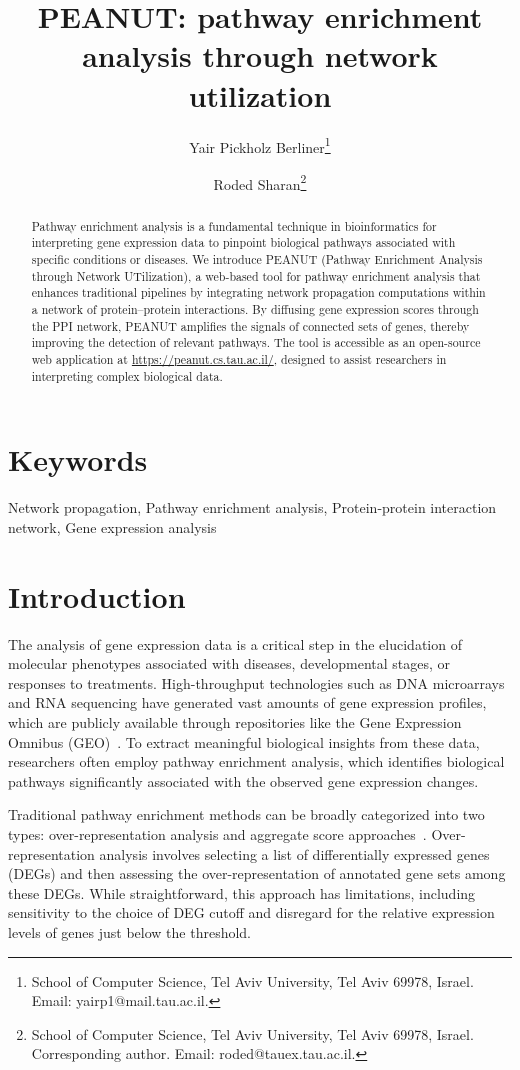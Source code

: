 \documentclass{article}
\title{PEANUT: pathway enrichment analysis through network utilization}
\author{
    Yair Pickholz Berliner\thanks{School of Computer Science, Tel Aviv University, Tel Aviv 69978, Israel. Email: yairp1@mail.tau.ac.il.} \and 
    Roded Sharan\thanks{School of Computer Science, Tel Aviv University, Tel Aviv 69978, Israel. Corresponding author. Email: roded@tauex.tau.ac.il.}
}
\date{}
\begin{document}
\maketitle
\begin{abstract}
Pathway enrichment analysis is a fundamental technique in bioinformatics for interpreting gene expression data to pinpoint biological pathways associated with specific conditions or diseases. We introduce PEANUT (Pathway Enrichment Analysis through Network UTilization), a web-based tool for pathway enrichment analysis that enhances traditional pipelines by integrating network propagation computations within a network of protein--protein interactions. By diffusing gene expression scores through the PPI network, PEANUT amplifies the signals of connected sets of genes, thereby improving the detection of relevant pathways.
The tool is accessible as an open-source web application at \url{https://peanut.cs.tau.ac.il/}, 
designed to assist researchers in interpreting complex biological data.
\end{abstract}

\section*{Keywords}
Network propagation, Pathway enrichment analysis, 
Protein-protein interaction network, Gene expression analysis

\section{Introduction}
The analysis of gene expression data is a critical step in the elucidation of molecular phenotypes associated with diseases, developmental stages, or responses to treatments. High-throughput technologies such as DNA microarrays and RNA sequencing have generated vast amounts of gene expression profiles, which are publicly available through repositories like the Gene Expression Omnibus (GEO)~\cite{Barrett2013}. To extract meaningful biological insights from these data, researchers often employ pathway enrichment analysis, which identifies biological pathways significantly associated with the observed gene expression changes.

Traditional pathway enrichment methods can be broadly categorized into two types: over-representation analysis and aggregate score approaches~\cite{Irizarry2009}. Over-representation analysis involves selecting a list of differentially expressed genes (DEGs) and then assessing the over-representation of annotated gene sets among these DEGs. While straightforward, this approach has limitations, including sensitivity to the choice of DEG cutoff and disregard for the relative expression levels of genes just below the threshold.
\end{document}
